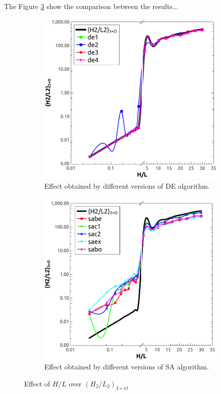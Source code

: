 \documentclass[10pt,fleqn,a4paper,twoside]{article}
\begin{document}
The Figure \ref{figure05} show the comparison between the results...

\begin{figure}[h!]
\centering
	\begin{subfigure}{0.52\textwidth}
		\centering
		\includegraphics[width=1\linewidth]{imgs/de/g_hl_h2l2_1.png}
		\caption{ {\small Effect obtained by different versions of DE algorithm.}}
		\label{figure05:sub1}
	\end{subfigure}%
	\begin{subfigure}{0.52\textwidth}
		\centering
		\includegraphics[width=1\linewidth]{imgs/sa/g_hl_h2l2_1.png}
		\caption{ {\small Effect obtained by different versions of SA algorithm.}}
		\label{figure05:sub2}
	\end{subfigure}%
\caption{Effect of $H/L$ over ${(H_{2}/L_{2})_{3\times O}}$}
\label{figure05}
\end{figure}
\end{document}

